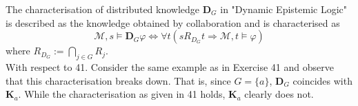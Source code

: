 \documentclass[11pt,a4paper]{article}
\newcommand{\eall}{\mathbf{K}}
\newcommand{\edist}{\mathbf{D}}
\newcommand{\sto}{\Rightarrow}
\begin{document}
The characterisation of distributed knowledge $\edist_G$ in "Dynamic Epistemic Logic" is described as the knowledge obtained by collaboration and is characterised as 
\begin{equation*}
\mathcal{M},s \models \edist_G \varphi \iff \forall t (s R_{D_G} t \sto \mathcal{M},t \models \varphi)
\end{equation*}
where $R_{D_G}:= \bigcap_{j \in G} R_j$. \\

With respect to 41. Consider the same example as in Exercise 41 and observe that this characterisation breaks down. That is, since $G=\{a\}$, $\edist_G$ coincides with $\eall_a$. While the characterisation as given in 41 holds, $\eall_a$ clearly does not.
\end{document}
